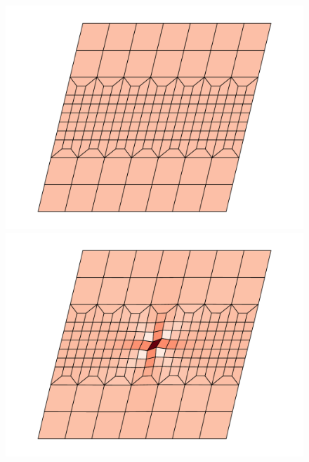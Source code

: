 \documentclass[fleqn]{goose-article}
\begin{document}
\begin{figure}[htp]
    \centering
    \captionsetup[subfigure]{justification=centering}
    \begin{minipage}[t]{.40\textwidth}
        \centering
        \includegraphics[width=\textwidth]{example_shear_config.pdf}
    \end{minipage}
    \hspace{0.01\textwidth}
    \begin{minipage}[t]{.40\textwidth}
        \centering
        \includegraphics[width=\textwidth]{example_shear_config-perturbed.pdf}
    \end{minipage}

\end{figure}
\end{document}
